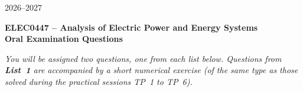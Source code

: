 \documentclass[a4paper,10pt]{article}
\begin{document}
\begin{flushright}
    2026--2027
\end{flushright}

\vspace{-1em}

\begin{center}
    {\Large \textbf{ELEC0447 -- Analysis of Electric Power and Energy Systems}}\\[0.3em]
    {\large \textbf{Oral Examination Questions}}
\end{center}

\vspace{0.3em}

\textit{You will be assigned two questions, one from each list below. Questions from \textbf{List~1} are accompanied by a short numerical exercise (of the same type as those solved during the practical sessions TP~1 to TP~6).}

\vspace{0.6em}
\end{document}
